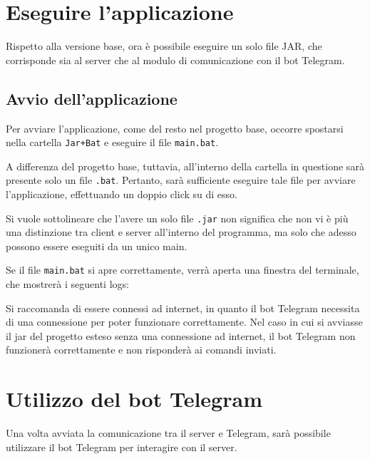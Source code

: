 \section{Eseguire l'applicazione}

Rispetto alla versione base, ora è possibile eseguire un solo file JAR, che corrisponde sia al server che al modulo di comunicazione con il bot Telegram. 

\subsection{Avvio dell'applicazione}

Per avviare l'applicazione, come del resto nel progetto base, occorre spostarsi nella cartella \texttt{Jar+Bat} e eseguire il file \texttt{main.bat}. 

A differenza del progetto base, tuttavia, all'interno della cartella in questione sarà presente solo un file \texttt{.bat}. Pertanto, sarà sufficiente eseguire tale file per avviare l'applicazione, effettuando un doppio click su di esso.

Si vuole sottolineare che l'avere un solo file \texttt{.jar} non significa che non vi è più una distinzione tra client e server all'interno del programma, ma solo che adesso possono essere eseguiti da un unico main. 

Se il file \texttt{main.bat} si apre correttamente, verrà aperta una finestra del terminale, che mostrerà i seguenti logs: 


\begin{tcolorbox}[ colback=white!5!white, colframe=gray, title={Avvertenza} ]
    Si raccomanda di essere connessi ad internet, in quanto il bot Telegram necessita di una connessione per poter funzionare correttamente. Nel caso in cui si avviasse il jar del progetto esteso senza una connessione ad internet, il bot Telegram non funzionerà correttamente e non risponderà ai comandi inviati.
\end{tcolorbox}

\section{Utilizzo del bot Telegram}

Una volta avviata la comunicazione tra il server e Telegram, sarà possibile utilizzare il bot Telegram per interagire con il server.

